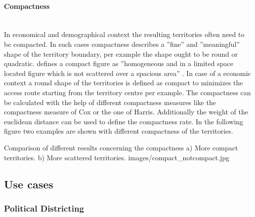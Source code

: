 \paragraph{Compactness}\mbox{} \\

In economical and demographical context the resulting territories often need to be compacted. In such cases compactness describes a ''fine'' and ''meaningful'' shape of the territory boundary, per example the shape ought to be round or quadratic. \citeauthor{young} defines a compact figure as ''homogeneous and in a limited space located figure which is not scattered over a spacious area'' \cite{young}. In case of a economic context a round shape of the territories is defined as compact to minimizes the access route starting from the territory centre per example. The compactness can be calculated with the help of different compactness measures like the compactness measure of Cox or the one of Harris. Additionally the weight of the euclidean distance can be used to define the compactness rate. In the following figure two examples are shown with different compactness of the territories.

\begin{figureOwn}{Comparison of different results concerning the compactness a) More compact territories. b) More scattered territories. }{images/compact_notcompact.jpg}\end{figureOwn} 


\subsection{Use cases}

\subsubsection{Political Districting}

